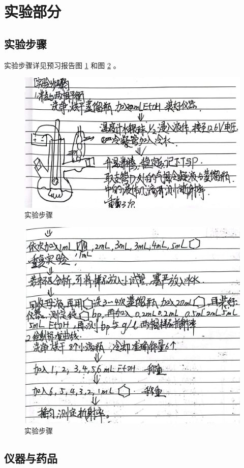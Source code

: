 \documentclass[cn,hazy,pku,12pt,normal,math=newtx,cite=super]{elegantnote}
\begin{document}
\section{实验部分}

\subsection{实验步骤}

实验步骤详见预习报告图 \ref{b} 和图 \ref{a} 。
\begin{figure}[htbp]
    \centering
    \includegraphics[width = .70\textwidth]{image/yxbg_2.jpg}
    \caption{实验步骤}\label{b}
\end{figure}

\begin{figure}[htbp]
    \centering
    \includegraphics[width = .70\textwidth]{image/yxbg_3.jpg}
    \caption{实验步骤}\label{a}
\end{figure}

\subsection{仪器与药品}
\end{document}
